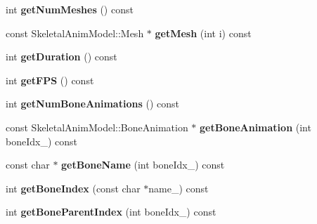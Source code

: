 \begin{DoxyCompactItemize}
\item 
int {\bfseries get\+Num\+Meshes} () const \hypertarget{class_magnum_1_1endif_1_1_data_ac8f0576d92b079054e2e257536b341ce}{}\label{class_magnum_1_1endif_1_1_data_ac8f0576d92b079054e2e257536b341ce}

\item 
const Skeletal\+Anim\+Model\+::\+Mesh $\ast$ {\bfseries get\+Mesh} (int i) const \hypertarget{class_magnum_1_1endif_1_1_data_ac94e90b4c8566a4c36a9fe88b9ebc5e0}{}\label{class_magnum_1_1endif_1_1_data_ac94e90b4c8566a4c36a9fe88b9ebc5e0}

\item 
int {\bfseries get\+Duration} () const \hypertarget{class_magnum_1_1endif_1_1_data_a9149b78da4354b7e745c9fceb6c67727}{}\label{class_magnum_1_1endif_1_1_data_a9149b78da4354b7e745c9fceb6c67727}

\item 
int {\bfseries get\+F\+PS} () const \hypertarget{class_magnum_1_1endif_1_1_data_a2fc948901ab11329ee4678559657252d}{}\label{class_magnum_1_1endif_1_1_data_a2fc948901ab11329ee4678559657252d}

\item 
int {\bfseries get\+Num\+Bone\+Animations} () const \hypertarget{class_magnum_1_1endif_1_1_data_aaaffdfe9180d8b50b1b709299b9f32b6}{}\label{class_magnum_1_1endif_1_1_data_aaaffdfe9180d8b50b1b709299b9f32b6}

\item 
const Skeletal\+Anim\+Model\+::\+Bone\+Animation $\ast$ {\bfseries get\+Bone\+Animation} (int bone\+Idx\+\_\+) const \hypertarget{class_magnum_1_1endif_1_1_data_aefa2891878950cca708ede385fe16602}{}\label{class_magnum_1_1endif_1_1_data_aefa2891878950cca708ede385fe16602}

\item 
const char $\ast$ {\bfseries get\+Bone\+Name} (int bone\+Idx\+\_\+) const \hypertarget{class_magnum_1_1endif_1_1_data_ae01f2b1b403338df0c14cd877f43ab61}{}\label{class_magnum_1_1endif_1_1_data_ae01f2b1b403338df0c14cd877f43ab61}

\item 
int {\bfseries get\+Bone\+Index} (const char $\ast$name\+\_\+) const \hypertarget{class_magnum_1_1endif_1_1_data_a4a9480e4e0f7b7c43c1ffee8bbd54b46}{}\label{class_magnum_1_1endif_1_1_data_a4a9480e4e0f7b7c43c1ffee8bbd54b46}

\item 
int {\bfseries get\+Bone\+Parent\+Index} (int bone\+Idx\+\_\+) const \hypertarget{class_magnum_1_1endif_1_1_data_aa9df0766f971042061f2566a26ad066d}{}\label{class_magnum_1_1endif_1_1_data_aa9df0766f971042061f2566a26ad066d}


\end{DoxyCompactItemize}
